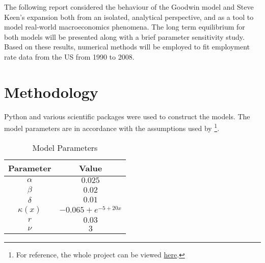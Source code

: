 \documentclass[12pt, centerh1]{article}
\begin{document}
\noindent The following report considered the behaviour of the Goodwin model and Steve Keen’s expansion both from an isolated, analytical perspective, and as a tool to model real-world macroeconomics phenomena. The long term equilibrium for both models will be presented along with a brief parameter sensitivity study. Based on these results, numerical methods will be employed to fit employment rate data from the US from 1990 to 2008.

\newpage %

\section{Methodology}
Python \citep{rossum1995python} and various scientific packages were used to construct the models. The model parameters are in accordance with the assumptions used by \citet{grasselli2012analysis}\footnote{For reference, the whole project can be viewed \href{https://github.com/grantwforsythe/math3mb3}{here}.}. 
\begin{table}[!h]
\centering
\begin{tabular}{|c|c|}
\hline
\textbf{Parameter }             & \textbf{Value}                                        \\
\hline\hline
$\alpha$  & $0.025$                                                  \\
$\beta$   & $0.02$                                                   \\
$\delta$  & $0.01$                                                      \\
$\kappa(x)$               & $-0.065 + e^{-5+20x}$                            \\
$r$                      & $0.03$                                                   \\
$\nu$     & $3$                                                     \\
\hline
\end{tabular}
\caption{Model Parameters}
\label{table:parameters}
\end{table}
\end{document}

